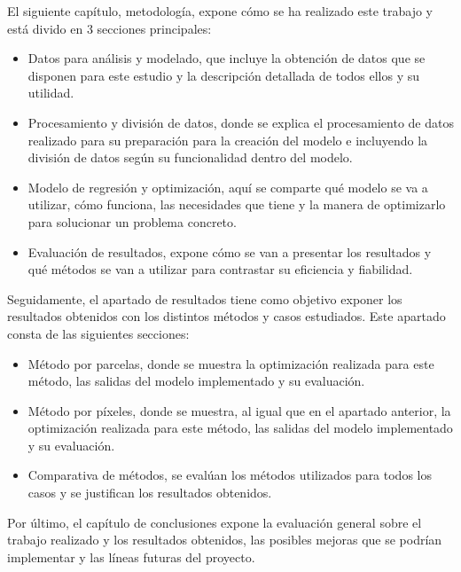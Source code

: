 \par El siguiente capítulo, metodología, expone cómo se ha realizado este trabajo y está divido en 3 secciones principales:
\begin{itemize}
	\item Datos para análisis y modelado, que incluye la obtención de datos que se disponen para este estudio y la descripción detallada de todos ellos y su utilidad.
	\item Procesamiento y división de datos, donde se explica el procesamiento de datos realizado para su preparación para la creación del modelo e incluyendo la división de datos según su funcionalidad dentro del modelo. 
	\item Modelo de regresión y optimización, aquí se comparte qué modelo se va a utilizar, cómo funciona, las necesidades que tiene y la manera de optimizarlo para solucionar un problema concreto. 
	\item Evaluación de resultados, expone cómo se van a presentar los resultados y qué métodos se van a utilizar para contrastar su eficiencia y fiabilidad. 
\end{itemize}

\par Seguidamente, el apartado de resultados tiene como objetivo exponer los resultados obtenidos con los distintos métodos y casos estudiados. Este apartado consta de las siguientes secciones: 
\begin{itemize}
	\item Método por parcelas, donde se muestra la optimización realizada para este método, las salidas del modelo implementado y su evaluación. 
	\item Método por píxeles, donde se muestra, al igual que en el apartado anterior, la optimización realizada para este método, las salidas del modelo implementado y su evaluación. 
	\item Comparativa de métodos, se evalúan los métodos utilizados para todos los casos y se justifican los resultados obtenidos. 
\end{itemize}

\par Por último, el capítulo de conclusiones expone la evaluación general sobre el trabajo realizado y los resultados obtenidos, las posibles mejoras que se podrían implementar y las líneas futuras del proyecto.